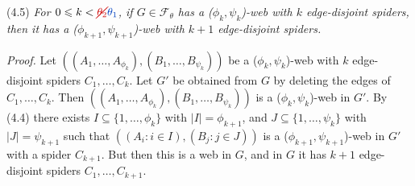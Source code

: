 \stmt
(4.5) \textit{For $0 \le k < \delm{\theta_2}\fix{\theta_1}$, if $G \in \mathcal{F}_\theta$ has a ($\phi_k, \psi_k$)-web with $k$ edge-disjoint spiders, then it has a ($\phi_{k+1}, \psi_{k+1}$)-web with $k + 1$ edge-disjoint spiders.}

\textit{Proof.} Let $((A_1, \dots, A_{\phi_k}), (B_1, \dots, B_{\psi_k}))$ be a ($\phi_k, \psi_k$)-web with $k$ edge-disjoint spiders $C_1, \dots, C_k$. Let $G'$ be obtained from $G$ by deleting the edges of $C_1, \dots, C_k$. Then $((A_1, \dots, A_{\phi_k}), (B_1, \dots, B_{\psi_k}))$ is a ($\phi_k, \psi_k$)-web in $G'$. By (4.4) there exists $I \subseteq \{1, \dots, \phi_k\}$ with $|I| = \phi_{k+1}$, and $J \subseteq \{1, \dots, \psi_k\}$ with $|J| = \psi_{k+1}$ such that $((A_i \colon i \in I), (B_j \colon j \in J))$ is a ($\phi_{k+1}, \psi_{k+1}$)-web in $G'$ with a spider $C_{k+1}$. But then this is a web in $G$, and in $G$ it has $k + 1$ edge-disjoint spiders $C_1, \dots, C_{k+1}$.
